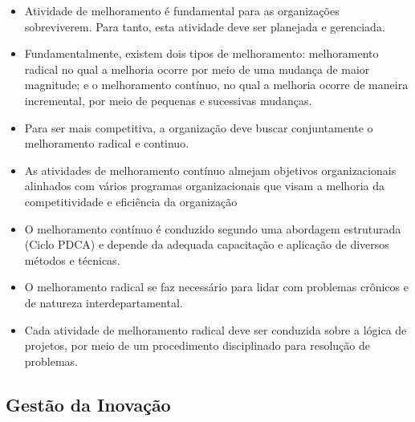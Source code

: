 \documentclass{article}
\begin{document}
\begin{itemize}
    \item Atividade de melhoramento é fundamental para as organizações sobreviverem. Para tanto, esta atividade deve ser planejada e gerenciada.
    \item Fundamentalmente, existem dois tipos de melhoramento: melhoramento radical no qual a melhoria ocorre por meio de uma mudança de maior magnitude; e o melhoramento contínuo, no qual a melhoria ocorre de maneira incremental, por meio de pequenas e sucessivas mudanças.
    \item Para ser mais competitiva, a organização deve buscar conjuntamente o melhoramento radical e continuo. 
    \item As atividades de melhoramento contínuo almejam objetivos organizacionais alinhados com vários programas organizacionais que visam a melhoria da competitividade e eficiência da organização
    \item O melhoramento contínuo é conduzido segundo uma abordagem estruturada (Ciclo PDCA) e depende da adequada capacitação e aplicação de diversos métodos e técnicas.
    \item O melhoramento radical se faz necessário para lidar com problemas crônicos e de natureza interdepartamental.
    \item Cada atividade de melhoramento radical deve ser conduzida sobre a lógica de projetos, por meio de um procedimento disciplinado para resolução de problemas.
\end{itemize}

\subsection{Gestão da Inovação}
\end{document}
